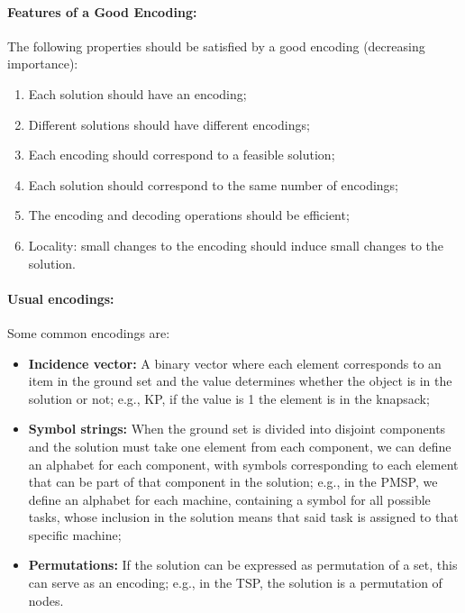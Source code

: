 \documentclass{article}
\begin{document}
	\paragraph{Features of a Good Encoding:} The following properties should be satisfied by a good encoding (decreasing importance):
	\begin{enumerate}
		\item Each solution should have an encoding;
		\item Different solutions should have different encodings;
		\item Each encoding should correspond to a feasible solution;
		\item Each solution should correspond to the same number of encodings;
		\item The encoding and decoding operations should be efficient;
		\item Locality: small changes to the encoding should induce small changes to the solution.\\
	\end{enumerate}
	
	\paragraph{Usual encodings:} Some common encodings are:
	\begin{itemize}
		\item \textbf{Incidence vector:} A binary vector where each element corresponds to an item in the ground set and the value determines whether the object is in the solution or not; e.g., KP, if the value is 1 the element is in the knapsack;
		\item \textbf{Symbol strings:} When the ground set is divided into disjoint components and the solution must take one element from each component, we can define an alphabet for each component, with symbols corresponding to each element that can be part of that component in the solution; e.g., in the PMSP, we define an alphabet for each machine, containing a symbol for all possible tasks, whose inclusion in the solution means that said task is assigned to that specific machine;
		\item \textbf{Permutations:} If the solution can be expressed as permutation of a set, this can serve as an encoding; e.g., in the TSP, the solution is a permutation of nodes.\\
	\end{itemize}
	
\end{document}
